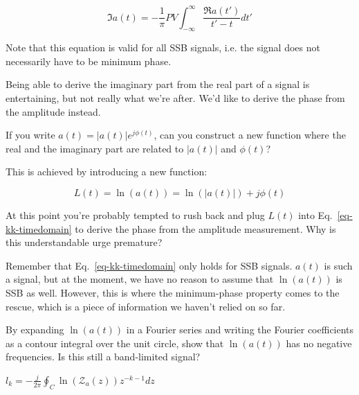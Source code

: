 \begin{equation}
\Im a(t) = -\frac{1}{\pi} PV \int_{- \infty}^{\infty} \frac{\Re a(t')}{t'-t}dt'
\label{eq-kk-timedomain}
\end{equation} 

\noindent{}

Note that this equation is valid for all SSB signals, i.e. the signal does not necessarily have to be minimum phase.

Being able to derive the imaginary part from the real part of a signal is entertaining, but not really what we're after. We'd like to derive the phase from the amplitude instead.

\begin{cue}
If you write $a(t)=\left|a(t)\right| e^{j \phi(t)}$, can you construct a new function where the real and the imaginary part are related to $\left|a(t)\right|$ and $\phi(t)$?     
\end{cue}

This is achieved by introducing a new function:

\begin{equation}
L(t) = \ln\left(a(t)\right) = \ln \left( \left|a(t)\right| \right)+ j \phi(t)
\end{equation}

\pagebreak

\begin{cue}
At this point you're probably tempted to rush back and plug $L(t)$ into Eq.~\ref{eq-kk-timedomain} to derive the phase from the amplitude measurement. Why is this understandable urge premature?
\end{cue}

Remember that Eq.~\ref{eq-kk-timedomain} only holds for SSB signals. $a(t)$ is such a signal, but at the moment, we have no reason to assume that $\ln\left(a(t)\right)$ is SSB as well. However, this is where the minimum-phase property comes to the rescue, which is a piece of information we haven't relied on so far.

\begin{exer}
By expanding $\ln(a(t))$ in a Fourier series and writing the Fourier coefficients as a contour integral over the unit circle, show that $\ln(a(t))$ has no negative frequencies. Is this still a band-limited signal?
\begin{hnt}
$l_k=-\frac{j}{2\pi} \oint_C \ln\left(\mathcal{Z}_a(z)\right) z^{-k-1} dz $
\end{hnt}
\end{exer}


